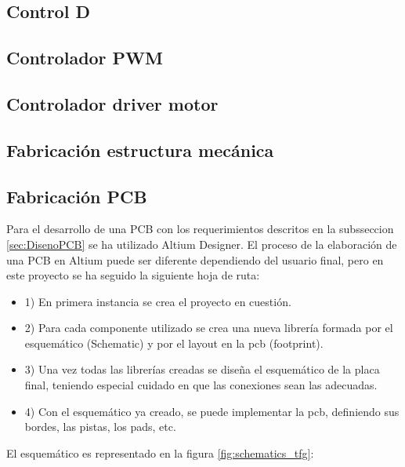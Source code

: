 \subsection{Control D}
\subsection{Controlador PWM}
\subsection{Controlador driver motor}
\subsection{Fabricación estructura mecánica}
\subsection{Fabricación PCB}
Para el desarrollo de una PCB con los requerimientos descritos en la subsseccion \ref{sec:DisenoPCB} se ha utilizado Altium Designer. El proceso de la elaboración de una PCB en Altium puede ser diferente dependiendo del usuario final, pero en este proyecto se ha seguido la siguiente hoja de ruta:

\begin{itemize}
	\item 1) En primera instancia se crea el proyecto en cuestión.
	\item 2) Para cada componente utilizado se crea una nueva librería formada por el esquemático (Schematic) y por el layout en la pcb (footprint).
	\item 3) Una vez todas las librerías creadas se diseña el esquemático de la placa final, teniendo especial cuidado en que las conexiones sean las adecuadas.
	\item 4) Con el esquemático ya creado, se puede implementar la pcb, definiendo sus bordes, las pistas, los pads, etc.
\end{itemize}

El esquemático es representado en la figura \ref{fig:schematics_tfg}: 
\newpage

